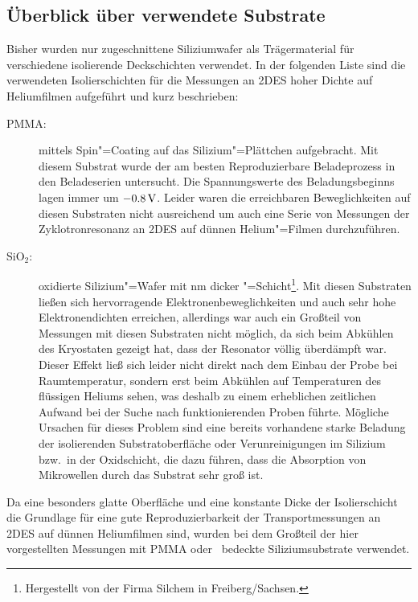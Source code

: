 \subsection{Überblick über verwendete Substrate}

Bisher wurden nur zugeschnittene Siliziumwafer als Trägermaterial für verschiedene isolierende Deckschichten verwendet. In der folgenden Liste sind die verwendeten Isolierschichten für die Messungen an 2DES hoher Dichte auf Heliumfilmen aufgeführt und kurz beschrieben:
\begin{description}
	\item [PMMA:] mittels Spin"=Coating auf das Silizium"=Plättchen aufgebracht. Mit diesem Substrat wurde der am besten Reproduzierbare Beladeprozess in den Beladeserien untersucht. Die Spannungswerte des Beladungsbeginns lagen immer um $\unit[-0.8]{V}$. Leider waren die erreichbaren Beweglichkeiten auf diesen Substraten nicht ausreichend um auch eine Serie von Messungen der Zyklotronresonanz an 2DES auf dünnen Helium"=Filmen durchzuführen.
	\item [SiO$_2$:] oxidierte Silizium"=Wafer mit \unit[200]{nm} dicker \SiO"=Schicht\footnote{Hergestellt von der Firma Silchem in Freiberg/Sachsen.}. Mit diesen Substraten ließen sich hervorragende Elektronenbeweglichkeiten und auch sehr hohe Elektronendichten erreichen, allerdings war auch ein Großteil von Messungen mit diesen Substraten nicht möglich, da sich beim Abkühlen des Kryostaten gezeigt hat, dass der Resonator völlig überdämpft war. Dieser Effekt ließ sich leider nicht direkt nach dem Einbau der Probe bei Raumtemperatur, sondern erst beim Abkühlen auf Temperaturen des flüssigen Heliums sehen, was deshalb zu einem erheblichen zeitlichen Aufwand bei der Suche nach funktionierenden Proben führte. Mögliche Ursachen für dieses Problem sind eine bereits vorhandene starke Beladung der isolierenden Substratoberfläche oder Verunreinigungen im Silizium bzw.\ in der Oxidschicht, die dazu führen, dass die Absorption von Mikrowellen durch das Substrat sehr groß ist.
\end{description}
Da eine besonders glatte Oberfläche und eine konstante Dicke der Isolierschicht die Grundlage für eine gute Reproduzierbarkeit der Transportmessungen an 2DES auf dünnen Heliumfilmen sind, wurden bei dem Großteil der hier vorgestellten Messungen mit PMMA oder \SiO\ bedeckte Siliziumsubstrate verwendet.

